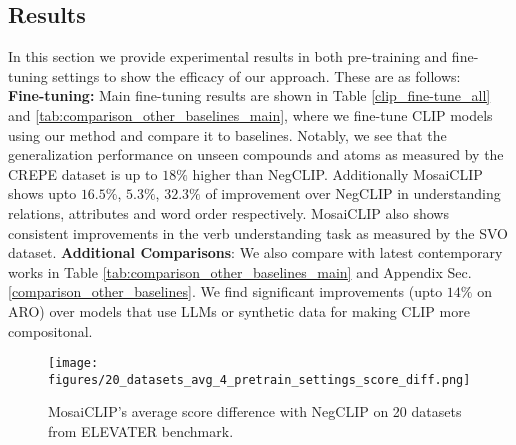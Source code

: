 \documentclass[11pt]{article}
\newcommand{\methodcomp}{MosaiCLIP}
\newcommand{\negclip}{NegCLIP}
\begin{document}
\subsection{Results}
\label{results}
In this section we provide experimental results in both pre-training and fine-tuning settings to show the efficacy of our approach. These are as follows:\\
\newline
\noindent \textbf{Fine-tuning:} Main fine-tuning results are shown in Table \ref{clip_fine-tune_all} and \ref{tab:comparison_other_baselines_main}, where we fine-tune CLIP models using our method and compare it to baselines. Notably, we see that the generalization performance on unseen compounds and atoms as measured by the CREPE dataset is up to {$18\%$} higher than NegCLIP. Additionally \methodcomp{} shows upto {$16.5\%$, $5.3\%$, ${32.3}\%$} of improvement over \negclip{} in understanding relations, attributes and word order respectively. \methodcomp{} also shows consistent improvements in the verb understanding task as measured by the SVO dataset. \textbf{Additional Comparisons}: We also compare with latest contemporary works in Table \ref{tab:comparison_other_baselines_main} and Appendix Sec. \ref{comparison_other_baselines}. We find significant improvements (upto $14\%$ on ARO) over models that use LLMs or synthetic data for making CLIP more compositonal.\\
    
\begin{figure}[h!]
    \centering
    \texttt{[image: figures/20\_datasets\_avg\_4\_pretrain\_settings\_score\_diff.png]}
    \caption{\methodcomp{}'s average score difference with \negclip{} on 20 datasets from {\color{blue} ELEVATER} benchmark.}
    \label{fig:20_datasets_avg_all_pretraining}
    \vspace{-0.5cm}
\end{figure}
    
\end{document}
